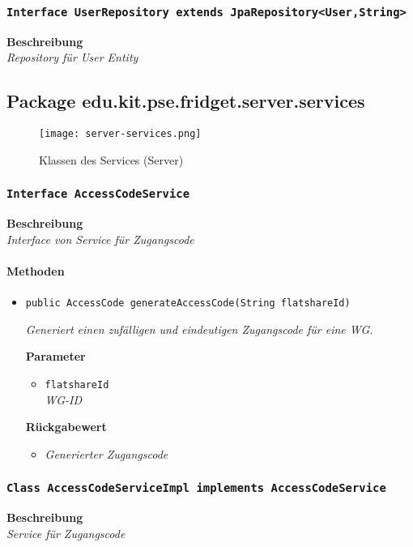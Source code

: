      \subsubsection{\texttt{Interface UserRepository extends JpaRepository<User,String>}}
     \textbf{Beschreibung} \\
     \textit{Repository für User Entity}
     \newpage
     \subsection{Package edu.kit.pse.fridget.server.services}
     \begin{figure}[H]
	       \centering
	       \texttt{[image: server-services.png]}
	       \caption{Klassen des Services (Server)}
	      \end{figure}
     \subsubsection{\texttt{Interface AccessCodeService}}
     \textbf{Beschreibung} \\
     \textit{Interface von Service für Zugangscode}
     \paragraph*{Methoden}
     \begin{itemize}
     	\item{\texttt{public AccessCode generateAccessCode(String flatshareId)}}
     	
     	\textit{Generiert einen zufälligen und eindeutigen Zugangscode für eine WG.}
     	
     	\textbf{Parameter}
     	\begin{itemize}
     		\item\texttt{flatshareId}\\
     		\textit{WG-ID}
     	\end{itemize}
     
     	\textbf{Rückgabewert}
     	\begin{itemize}
     		\item\textit{Generierter Zugangscode}
     	\end{itemize}
     \end{itemize}
     \subsubsection{\texttt{Class AccessCodeServiceImpl implements AccessCodeService}}
     \textbf{Beschreibung} \\
     \textit{Service für Zugangscode}
